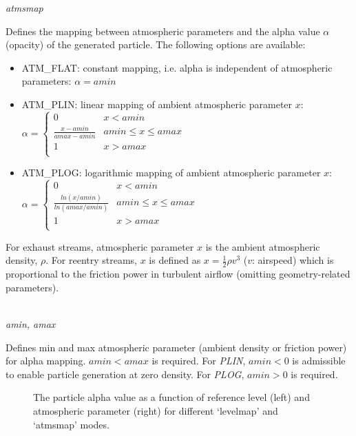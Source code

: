 \documentclass[Orbiter Developer Manual.tex]{subfiles}
\begin{document}
\noindent
\textit{atmsmap}
\begin{adjustwidth}{1cm}{0cm}
Defines the mapping between atmospheric parameters and the alpha value $\alpha$ (opacity) of the generated particle. The following options are available:

\begin{itemize}
\item ATM\_FLAT: constant mapping, i.e. alpha is independent of atmospheric parameters: $\alpha = amin$
\item ATM\_PLIN: linear mapping of ambient atmospheric parameter $x$:\\
$\alpha = 
\left\{
\begin{array}{ll}
	0 & x < amin \\
	\frac{x - amin}{amax - amin} & amin \leq x \leq amax \\
	1 & x > amax \\
\end{array} 
\right. $
\item ATM\_PLOG: logarithmic mapping of ambient atmospheric parameter $x$:\\
$\alpha = 
\left\{
\begin{array}{ll}
	0 & x < amin \\
	\frac{ln(x / amin)}{ln(amax / amin)} & amin \leq x \leq amax \\
	1 & x > amax \\
\end{array} 
\right. $
\end{itemize}
For exhaust streams, atmospheric parameter $x$ is the ambient atmospheric density, $\rho$. For reentry streams, $x$ is defined as $x = \frac{1}{2}\rho v^{3}$ ($v$: airspeed) which is proportional to the friction power in turbulent airflow (omitting geometry-related parameters).\\
\\
\end{adjustwidth}

\noindent
\textit{amin, amax}
\begin{adjustwidth}{1cm}{0cm}
Defines min and max atmospheric parameter (ambient density or friction power) for alpha mapping. $amin < amax$ is required. For \textit{PLIN}, $amin < 0$ is admissible to enable particle generation at zero density. For \textit{PLOG}, $amin > 0$ is required. 

\begin{figure}[H]
	\centering
	\caption{The particle alpha value as a function of reference level (left) and atmospheric parameter (right) for different ‘levelmap’ and ‘atmsmap’ modes.}
\end{figure}
\end{adjustwidth}
\end{document}
